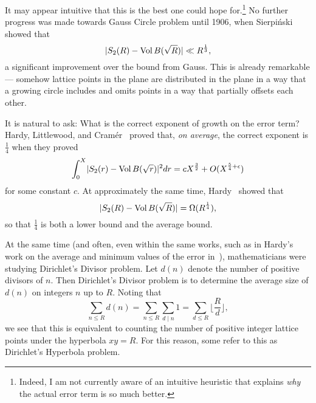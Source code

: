 It may appear intuitive that this is the best one could hope for.\footnote{Indeed, I am
  not currently aware of an intuitive heuristic that explains \emph{why} the actual error
term is so much better.}
No further progress was made towards Gauss Circle problem until 1906, when
Sierpi\'{n}ski~\cite{sierpinski1906pewnem} showed that
\begin{equation}
  \lvert S_2(R) - \operatorname*{Vol} B(\sqrt R) \rvert \ll R^{\frac{1}{3}},
\end{equation}
a significant improvement over the bound from Gauss.
This is already remarkable --- somehow lattice points in the plane are distributed in the
plane in a way that a growing circle includes and omits points in a way that partially
offsets each other.


It is natural to ask: What is the correct exponent of growth on the error term?
Hardy, Littlewood, and Cram\'{e}r~\cite{cramer1922} proved that, \emph{on average}, the
correct exponent is $\frac{1}{4}$ when they proved
\begin{equation}\label{eq:intro:hardy_littlewood_meansquare}
  \int_0^X \lvert S_2(r) - \operatorname*{Vol} B(\sqrt r) \rvert^2 dr = c X^{\frac{3}{2}} +
  O(X^{\frac{5}{4} + \epsilon})
\end{equation}
for some constant $c$.
At approximately the same time, Hardy~\cite{Hardy1917} showed that
\begin{equation}
  \lvert S_2(R) - \operatorname*{Vol} B(\sqrt R) \rvert = \Omega(R^{\frac{1}{4}}),
\end{equation}
so that $\frac{1}{4}$ is both a lower bound and the average bound.





At the same time (and often, even within the same works, such as in Hardy's work on the
average and minimum values of the error in~\cite{Hardy1917}), mathematicians were studying
Dirichlet's Divisor problem.
Let $d(n)$ denote the number of positive divisors of $n$.
Then Dirichlet's Divisor problem is to determine the average size of $d(n)$ on integers
$n$ up to $R$.
Noting that
\begin{equation}
  \sum_{n \leq R} d(n) =
  \sum_{n \leq R} \sum_{d \mid n} 1 =
  \sum_{d \leq R} \Big\lfloor \frac{R}{d} \Big\rfloor,
\end{equation}
we see that this is equivalent to counting the number of positive integer lattice points
under the hyperbola $xy = R$.
For this reason, some refer to this as Dirichlet's Hyperbola problem.


